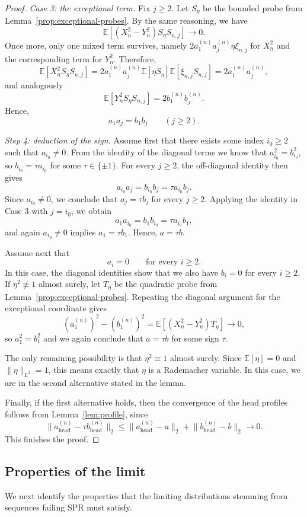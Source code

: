 \documentclass[11pt]{amsart}
\numberwithin{equation}{section}
\theoremstyle{definition}
\theoremstyle{remark}
\newcommand{\E}{\mathbb E}
\newcommand{\norm}[1]{\lVert #1 \rVert}
\begin{document}
\begin{proof}
\noindent\emph{Case 3: the exceptional term.}
Fix $j\ge2$.  Let $S_\eta$ be the bounded probe from
Lemma~\ref{prop:exceptional-probes}.  By the same reasoning, we have
\[
\E[(X_n^2-Y_n^2)S_\eta S_{n,j}]\longrightarrow0.
\]
Once more, only one mixed term survives, namely
$2a_1^{(n)}a_j^{(n)}\eta\xi_{n,j}$ for $X_n^2$ and the corresponding term for
$Y_n^2$.  Therefore,
\[
\E[X_n^2S_\eta S_{n,j}]
=2a_1^{(n)}a_j^{(n)}\E[\eta S_\eta]\E[\xi_{n,j}S_{n,j}]
=2a_1^{(n)}a_j^{(n)},
\]
and analogously
\[
\E[Y_n^2S_\eta S_{n,j}]
=2b_1^{(n)}b_j^{(n)}.
\]
Hence,
\[
a_1a_j=b_1b_j
\qquad(j\ge2).
\]
 \vspace{0.1em}
 
\noindent\emph{Step 4: deduction of the sign.}
Assume first that there exists some index $i_0\ge2$ such that $a_{i_0}\ne0$.
From the identity of the diagonal terms we know that
$a_{i_0}^2=b_{i_0}^2$, so $b_{i_0}=\tau a_{i_0}$ for some
$\tau\in\{\pm1\}$.  For every $j\ge2$, the off-diagonal identity then gives
\[
a_{i_0}a_j=b_{i_0}b_j=\tau a_{i_0}b_j.
\]
Since $a_{i_0}\ne0$, we conclude that $a_j=\tau b_j$ for every $j\ge2$.
Applying the identity in Case 3 with $j=i_0$, we obtain
\[
a_1a_{i_0}=b_1b_{i_0}=\tau a_{i_0}b_1,
\]
and again $a_{i_0}\ne0$ implies $a_1=\tau b_1$.  Hence, $a=\tau b$.

Assume next that
\[
a_i=0
\qquad\text{for every }i\ge2.
\]
In this case, the diagonal identities show that we also have $b_i=0$ for every $i\ge2$.
If $\eta^2\not\equiv1$ almost surely, let $T_\eta$ be the quadratic probe from
Lemma~\ref{prop:exceptional-probes}.  Repeating the diagonal argument for
the exceptional coordinate gives
\[
(a_1^{(n)})^2-(b_1^{(n)})^2
=\E[(X_n^2-Y_n^2)T_\eta]
\longrightarrow0,
\]
so $a_1^2=b_1^2$ and we again conclude that $a=\tau b$ for some sign $\tau$.

The only remaining possibility is that $\eta^2\equiv1$ almost surely.  Since
$\E[\eta]=0$ and $\norm{\eta}_{L^2}=1$, this means exactly that $\eta$ is a
Rademacher variable.  In this case, we are in the second alternative stated in
the lemma.

Finally, if the first alternative holds, then the convergence of the head
profiles follows from Lemma~\ref{lem:profile}, since
\[
\norm{a_{\mathrm{head}}^{(n)}-\tau b_{\mathrm{head}}^{(n)}}_2
\le
\norm{a_{\mathrm{head}}^{(n)}-a}_2
+
\norm{b_{\mathrm{head}}^{(n)}-b}_2
\longrightarrow0.
\]
This finishes the proof.
\end{proof}

\subsection{Properties of the limit} We next identify the properties that the limiting distributions stemming from sequences failing SPR must satisfy. 
\end{document}
